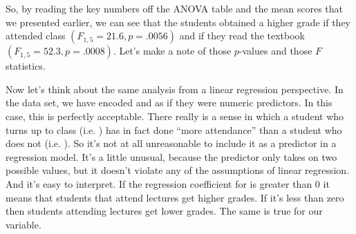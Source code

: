 So, by reading the key numbers off the ANOVA table and the mean scores that we presented earlier, we can see that the students obtained a higher grade if they attended class $(F_{1,5} = 21.6, p = .0056)$ and if they read the textbook $(F_{1,5} = 52.3, p = .0008)$. Let's make a note of those $p$-values and those $F$ statistics. 

Now let's think about the same analysis from a linear regression perspective. In the  data set, we have encoded  and  as if they were numeric predictors. In this case, this is perfectly acceptable. There really is a sense in which a student who turns up to class (i.e. ) has in fact done ``more attendance'' than a student who does not (i.e. ). So it's not at all unreasonable to include it as a predictor in a regression model. It's a little unusual, because the predictor only takes on two possible values, but it doesn't violate any of the assumptions of linear regression. And it's easy to interpret. If the regression coefficient for  is greater than 0 it means that students that attend lectures get higher grades. If it's less than zero then students attending lectures get lower grades. The same is true for our  variable.

